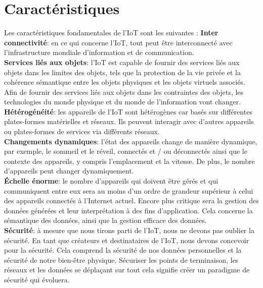 \section{Caractéristiques}
Les caractéristiques fondamentales de l'IoT sont les suivantes \cite{patel2016iot,vermesan2014iot}:
\textbf{Inter connectivité}: en ce qui concerne l'IoT, tout peut être interconnecté avec l'infrastructure mondiale d'information et de communication.\\

\textbf{Services liés aux objets}: l'IoT est capable de fournir des services liés aux objets dans les limites des objets, tels que la protection de la vie privée et la cohérence sémantique entre les objets physiques et les objets virtuels associés. Af{\kern0pt}in de fournir des services liés aux objets dans les contraintes des objets, les technologies du monde physique et du monde de l'information vont changer.\\

\textbf{Hétérogénéité}: les appareils de l'IoT sont hétérogènes car basés sur dif{\kern0pt}férentes  plates-formes matérielles et réseaux. Ils peuvent interagir avec d'autres appareils ou plates-formes de services via dif{\kern0pt}férents réseaux.\\

\textbf{Changements dynamiques}: l'état des appareils change de manière dynamique, par exemple, le sommeil et le réveil, connectés et / ou déconnectés ainsi que le contexte des appareils, y compris l'emplacement et la vitesse. De plus, le nombre d'appareils peut changer dynamiquement.\\

\textbf{Échelle énorme}: le nombre d'appareils qui doivent être gérés et qui communiquent entre eux sera au moins d'un ordre de grandeur supérieur à celui des appareils connectés à l'Internet actuel. Encore plus critique sera la gestion des données générées et leur interprétation à des f{\kern0pt}ins d'application. Cela concerne la sémantique des données, ainsi que la gestion ef{\kern0pt}f{\kern0pt}icace des données.\\

\textbf{Sécurité}: à mesure que nous tirons parti de l'IoT, nous ne devons pas oublier la sécurité. En tant que créateurs et destinataires de l'IoT, nous devons concevoir pour la sécurité. Cela comprend la sécurité de nos données personnelles et la sécurité de notre bien-être physique. Sécuriser les points de terminaison, les réseaux et les données se déplaçant sur tout cela signif{\kern0pt}ie créer un paradigme de sécurité qui évoluera.\\


